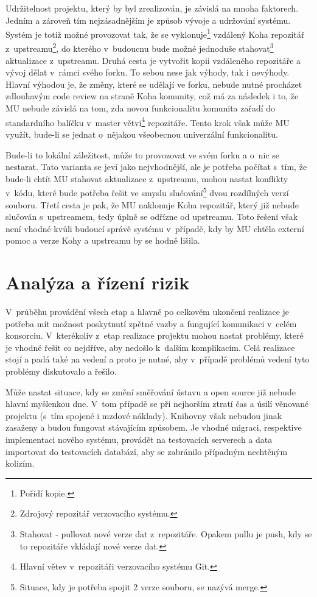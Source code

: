 \documentclass[
	11pt, oneside, printed, draft, 
	table,   %
	lof,     %
	lot     %
]{fithesis3}
\begin{document}
{Udržitelnost projektu, který by byl zrealizován, je závislá na mnoha faktorech. Jedním a zároveň tím nejzásadnějším je způsob vývoje a udržování systému. Systém je totiž možné provozovat tak, že se vyklonuje\footnote{Pořídí kopie.} vzdálený Koha repozitář z~upstreamu\footnote{Zdrojový repozitář verzovacího systému.}, do kterého v~budoucnu bude možné jednoduše stahovat\footnote{Stahovat - pullovat nové verze dat z~repozitáře. Opakem pullu je push, kdy se to repozitáře vkládají nové verze dat.} aktualizace z~upstreamu. Druhá cesta je vytvořit kopii vzdáleného repozitáře a vývoj dělat v~rámci svého forku. To sebou nese jak výhody, tak i nevýhody. Hlavní výhodou je, že změny, které se udělají ve forku, nebude nutné procházet zdlouhavým code review na straně Koha komunity, což má za následek i to, že MU nebude závislá na tom, zda novou funkcionalitu komunita zařadí do standardního balíčku v~master větvi\footnote{Hlavní větev v~repozitáři verzovacího systému Git.} repozitáře. Tento krok však může MU využít, bude-li se jednat o~nějakou všeobecnou univerzální funkcionalitu. 

Bude-li to lokální záležitost, může to provozovat ve svém forku a o~nic se nestarat. Tato varianta se jeví jako nejvhodnější, ale je potřeba počítat s~tím, že bude-li chtít MU stahovat aktualizace z~upstreamu, mohou nastat konflikty v~kódu, které bude potřeba řešit ve smyslu slučování\footnote{Situace, kdy je potřeba spojit 2 verze souboru, se nazývá merge.} dvou rozdílných verzí souboru. Třetí cesta je pak, že MU naklonuje Koha repozitář, který již nebude slučován s~upstreamem, tedy úplně se odřízne od upstreamu. Toto řešení však není vhodné kvůli budoucí správě systému v~případě, kdy by MU chtěla externí pomoc a verze Kohy a upstreamu by se hodně lišila. 

\section{Analýza a řízení rizik}
V~průběhu provádění všech etap a hlavně po celkovém ukončení realizace je potřeba mít možnost poskytnutí zpětné vazby a fungující komunikaci v~celém konsorciu. V~kterékoliv z~etap realizace projektu mohou nastat problémy, které je vhodné řešit co nejdříve, aby nedošlo k~dalším komplikacím. Celá realizace stojí a padá také na vedení a proto je nutné, aby v~případě problémů vedení tyto problémy diskutovalo a řešilo. 

Může nastat situace, kdy se změní směřování ústavu a open source již nebude hlavní myšlenkou dne. V~tom případě se při nejhorším ztratí čas a úsilí věnované projektu (s~tím spojené i mzdové náklady). Knihovny však nebudou jinak zasaženy a budou fungovat stávajícím způsobem. Je vhodné migraci, respektive implementaci nového systému, provádět na testovacích serverech a data importovat do testovacích databází, aby se zabránilo případným nechtěným kolizím.

}
\end{document}
